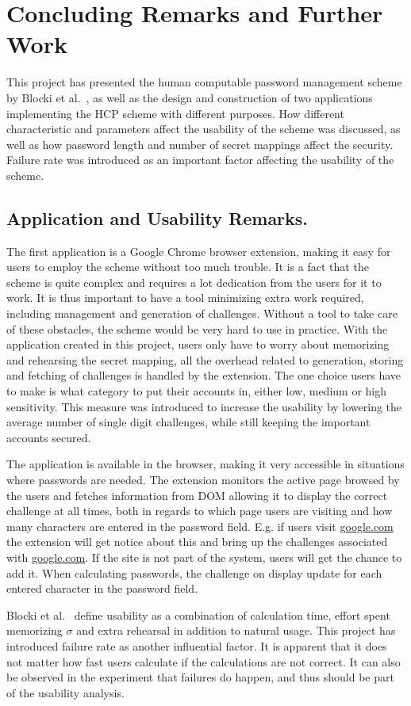 \chapter{Concluding Remarks and Further Work}
This project has presented the human computable password management scheme by Blocki et al.~\cite{hcp-blocki}, as well as the design and construction of two applications implementing the HCP scheme with different purposes. How different characteristic and parameters affect the usability of the scheme was discussed, as well as how password length and number of secret mappings affect the security. Failure rate was introduced as an important factor affecting the usability of the scheme. 

\section{Application and Usability Remarks.}
\par The first application is a Google Chrome browser extension, making it easy for users to employ the scheme without too much trouble. It is a fact that the scheme is quite complex and requires a lot dedication from the users for it to work. It is thus important to have a tool minimizing extra work required, including management and generation of challenges. Without a tool to take care of these obstacles, the scheme would be very hard to use in practice. With the application created in this project, users only have to worry about memorizing and rehearsing the secret mapping, all the overhead related to generation, storing and fetching of challenges is handled by the extension. The one choice users have to make is what category to put their accounts in, either low, medium or high sensitivity. This measure was introduced to increase the usability by lowering the average number of single digit challenges, while still keeping the important accounts secured.
\par The application is available in the browser, making it very accessible in situations where passwords are needed. The extension monitors the active page browsed by the users and fetches information from DOM allowing it to display the correct challenge at all times, both in regards to which page users are visiting and how many characters are entered in the password field. E.g. if users visit \url{google.com} the extension will get notice about this and bring up the challenges associated with \url{google.com}. If the site is not part of the system, users will get the chance to add it. When calculating passwords, the challenge on display update for each entered character in the password field.
\par Blocki et al.~\cite{hcp-blocki} define usability as a combination of calculation time, effort spent memorizing $\sigma$ and extra rehearsal in addition to natural usage. This project has introduced failure rate as another influential factor. It is apparent that it does not matter how fast users calculate if the calculations are not correct. It can also be observed in the experiment that failures do happen, and thus should be part of the usability analysis.

